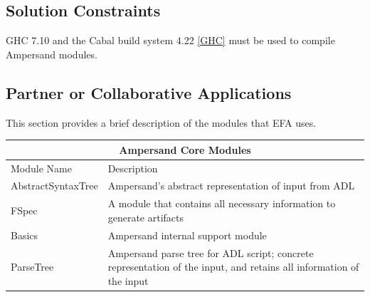 \documentclass[12pt]{report}
\begin{document}
\subsection{Solution Constraints}\label{subsec:SolutionConstraints}
GHC 7.10  and the Cabal build system 4.22 \ref{GHC} must be used to compile 
Ampersand modules. 
\subsection{Partner or Collaborative Applications}\label{subsec:Collaborative}
This section provides a brief description of the modules that EFA uses. 

\begin{adjustbox}{center}
\begin{tabular}{ |p{3.2cm}|p{11cm}|  }
    \hline
    \multicolumn{2}{|c|}{Ampersand Core Modules} \\ 
    \hline\hline
    Module Name & Description\\
    \hline
    AbstractSyntaxTree   & Ampersand's abstract representation of input from 
    ADL    \\
    \hline
    FSpec &   A module that contains all necessary information to generate 
    artifacts\\
    \hline
    Basics & Ampersand internal support module\\
    \hline
    ParseTree    & Ampersand parse tree for ADL script; concrete representation 
    of the input, and retains all information of the input \\
    \hline
\end{tabular}
\end{adjustbox}
\end{document}
